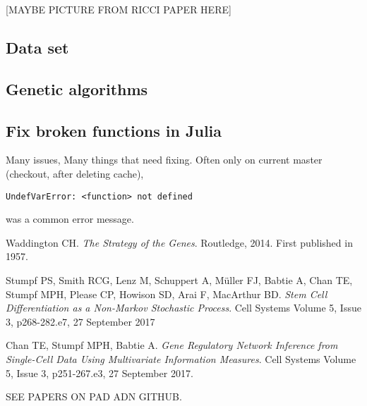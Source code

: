 \documentclass[journal, a4paper]{IEEEtran}
\begin{document}
[MAYBE PICTURE FROM RICCI PAPER HERE]

\subsection{Data set}

\subsection{Genetic algorithms}

\subsection{Fix broken functions in Julia}

Many issues, Many things that need fixing.
Often only on current master (checkout, after deleting cache), \begin{verbatim}
UndefVarError: <function> not defined
\end{verbatim}
was a common error message.


\begin{thebibliography}{99}
	
	Waddington CH. \textit{The Strategy of the Genes}. Routledge, 2014. First published in 1957. 
	
	Stumpf PS, Smith RCG, Lenz M, Schuppert A, M{\"u}ller FJ, Babtie A,
	Chan TE, Stumpf MPH, Please CP, Howison SD, Arai F, MacArthur BD. \textit{Stem Cell Differentiation as a Non-Markov Stochastic Process}. Cell Systems Volume 5, Issue 3, p268-282.e7, 27 September 2017 
	
	Chan TE, Stumpf MPH, Babtie A. \textit{Gene Regulatory Network Inference from Single-Cell Data Using Multivariate Information Measures}. Cell Systems Volume 5, Issue 3, p251-267.e3, 27 September 2017.
	
	
	SEE PAPERS ON PAD ADN GITHUB.
	
	
\end{thebibliography}

\end{document}
